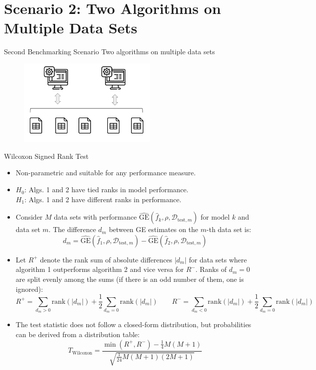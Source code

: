 \documentclass[11pt,compress,t,notes=noshow, aspectratio=169, xcolor=table]{beamer}
\newcommand{\Dtestm}{\mathcal{D}_{\text{test}, m}}
\begin{document}
\section{Scenario 2: Two Algorithms on Multiple Data Sets}
\begin{frame}{Second Benchmarking Scenario}
\vfill
\centering
\large{Two algorithms on multiple data sets}
    \begin{figure}
        \includegraphics[width = 0.6\textwidth]{figure/2algos_multipledatasets.png}
    \end{figure}
\vfill
\end{frame}

\begin{frame}{Wilcoxon Signed Rank Test}
    \begin{itemize}
        \item Non-parametric and suitable for any performance measure.
        \item $H_0$: Algs. 1 and 2 have tied ranks in model performance. \\
        $H_1$: Algs. 1 and 2 have different ranks in performance.
        \item Consider $M$ data sets with performance $\widehat{\text{GE}}(\widehat{f}_k, \rho, \Dtestm)$ for model $k$ and data set $m$. The difference $d_m$ between GE estimates on the $m$-th data set is:
        $$
        d_m = \widehat{\text{GE}}(\widehat{f}_1, \rho, \Dtestm) - \widehat{\text{GE}}(\widehat{f}_2, \rho, \Dtestm)
        $$
        \item Let $R^{+}$ denote the rank sum of absolute differences $|d_m|$ for data sets where algorithm 1 outperforms algorithm 2 and vice versa for $R^{-}$. Ranks of $d_m = 0$ are split evenly among the sums (if there is an odd number of them, one is ignored):
        $$
        R^{+} = \sum_{d_m > 0} \text{rank}(|d_m|) + \frac{1}{2} \sum_{d_m = 0} \text{rank}(|d_m|) \quad\quad R^{-} = \sum_{d_m < 0} \text{rank}(|d_m|) + \frac{1}{2} \sum_{d_m = 0} \text{rank}(|d_m|)
        $$
        \item The test statistic does not follow a closed-form distribution, but probabilities can be derived from a distribution table:
        $$
        T_{\text{Wilcoxon}} = \frac{\min(R^{+}, R^{-})   - \frac{1}{4}M(M + 1)}{\sqrt{\frac{1}{24}M(M + 1)(2M + 1)}}
        $$
    \end{itemize}
\end{frame}
\end{document}
